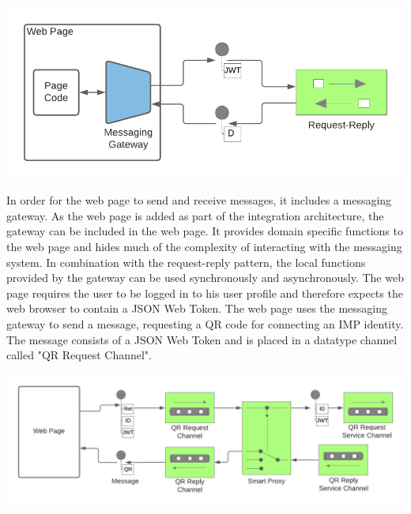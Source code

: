 \documentclass[
     12pt,         %
     a4paper,      %
     BCOR=10mm,version=first,     %
     DIV=14,version=first,        %
     ]{scrreprt}
\begin{document}
\begin{center}
    \includegraphics[width=15cm]{Diagrams/Integration 1/Connection/Messaging 1.png}
\end{center}

In order for the web page to send and receive messages, it includes a messaging gateway. As the web page is added as part of the integration architecture, the gateway can be included in the web page. It provides domain specific functions to the web page and hides much of the complexity of interacting with the messaging system. In combination with the request-reply pattern, the local functions provided by the gateway can be used synchronously and asynchronously.
The web page requires the user to be logged in to his user profile and therefore expects the web browser to contain a JSON Web Token. The web page uses the messaging gateway to send a message, requesting a QR code for connecting an IMP identity. The message consists of a JSON Web Token and is placed in a datatype channel called "QR Request Channel". 

\begin{center}
    \includegraphics[width=15cm]{Diagrams/Integration 1/Connection/Messaging 2.png}
\end{center}
\end{document}
